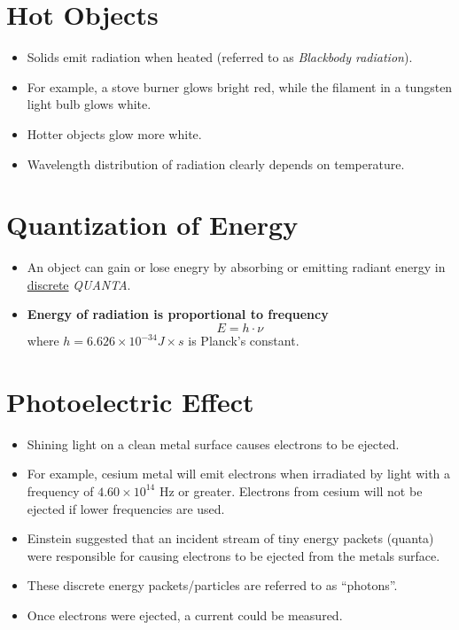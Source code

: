 \documentclass[
	chapter=7,
	title={Quantum Theory {\&} the Electronic Structure of Atoms},
	showanswers=true,
]{chem122notes}
\begin{document}
\section{Hot Objects}\label{sec:hot-objects}
\begin{itemize}
	\item Solids emit radiation when heated (referred to as \textit{Blackbody radiation}).
	\item For example, a stove burner glows bright red, while the filament in a tungsten light bulb glows white.
	\item Hotter objects glow more white.
	\item Wavelength distribution of radiation clearly depends on temperature.
\end{itemize}

\section{Quantization of Energy}\label{sec:quantization-of-energy}
\begin{itemize}
	\item An object can gain or lose enegry by absorbing or emitting radiant energy in \underline{discrete} \emph{QUANTA}.
	\item \textbf{Energy of radiation is proportional to frequency}
	\begin{equation}
		E = h \cdot \nu
		\label{eq:planck-radiation}
	\end{equation}
	where $h=6.626 \times 10^{-34} J\times s$ is Planck's constant\label{dfn:plancks-constant}.
\end{itemize}

\section{Photoelectric Effect}\label{sec:photoelectric-effect}
\begin{itemize}
	\item Shining light on a clean metal surface causes electrons to be ejected.
	\item For example, cesium metal will emit electrons when irradiated by light with a frequency of $4.60 \times 10^{14}$ Hz or greater.
	Electrons from cesium will not be ejected if lower frequencies are used.
	\item Einstein suggested that an incident stream of tiny energy packets (quanta) were responsible for causing electrons to be ejected from the metals surface.
	\item These discrete energy packets/particles are referred to as ``photons''.
	\item Once electrons were ejected, a current could be measured.
\end{itemize}
\end{document}

